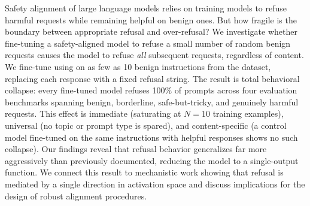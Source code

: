 Safety alignment of large language models relies on training models to refuse harmful requests while remaining helpful on benign ones. But how fragile is the boundary between appropriate refusal and over-refusal? We investigate whether fine-tuning a safety-aligned model to refuse a small number of random benign requests causes the model to refuse \emph{all} subsequent requests, regardless of content. We fine-tune \qwen using \lora on as few as 10 benign instructions from the \alpaca dataset, replacing each response with a fixed refusal string. The result is total behavioral collapse: every fine-tuned model refuses 100\% of prompts across four evaluation benchmarks spanning benign, borderline, safe-but-tricky, and genuinely harmful requests. This effect is immediate (saturating at $N{=}10$ training examples), universal (no topic or prompt type is spared), and content-specific (a control model fine-tuned on the same instructions with helpful responses shows no such collapse). Our findings reveal that refusal behavior generalizes far more aggressively than previously documented, reducing the model to a single-output function. We connect this result to mechanistic work showing that refusal is mediated by a single direction in activation space and discuss implications for the design of robust alignment procedures.
